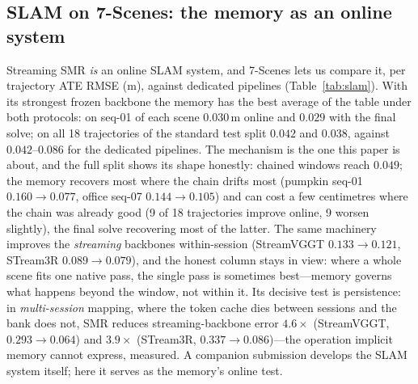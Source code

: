 \documentclass{article}
\newcommand{\smr}{\textsc{SMR}}
\begin{document}
\subsection{SLAM on 7-Scenes: the memory as an online system}
\label{sec:results-slam}
Streaming \smr{} \emph{is} an online SLAM system, and 7-Scenes
\citep{sevenscenes} lets us compare it, per trajectory ATE RMSE (m), against
dedicated pipelines (Table~\ref{tab:slam}). With its strongest frozen backbone
the memory has the best average of the table under both protocols: on seq-01
of each scene $0.030$\,m online and $0.029$ with the final solve; on all 18
trajectories of the standard test split $0.042$ and $0.038$, against
$0.042$--$0.086$ for the dedicated pipelines. The mechanism is the one this
paper is about, and the full split shows its shape honestly: chained windows
reach $0.049$; the memory recovers most where the chain drifts most (pumpkin
seq-01 $0.160\!\to\!0.077$, office seq-07 $0.144\!\to\!0.105$) and can cost
a few centimetres where the chain was already good (9 of 18 trajectories
improve online, 9 worsen slightly), the final solve recovering most of the
latter. The same machinery improves the \emph{streaming}
backbones within-session (StreamVGGT $0.133\!\to\!0.121$, STream3R
$0.089\!\to\!0.079$), and the honest column stays in view: where a whole
scene fits one native pass, the single pass is sometimes best---memory
governs what happens beyond the window, not within it. Its decisive test is
persistence: in \emph{multi-session} mapping, where the token cache dies
between sessions and the bank does not, \smr{} reduces streaming-backbone
error $4.6\times$ (StreamVGGT, $0.293\!\to\!0.064$) and $3.9\times$
(STream3R, $0.337\!\to\!0.086$)---the operation implicit memory cannot
express, measured. A companion submission develops the SLAM system itself;
here it serves as the memory's online test.
\end{document}
